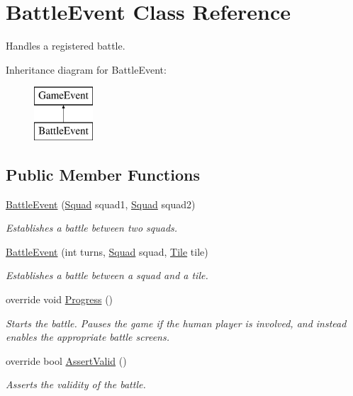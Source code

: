 \hypertarget{class_battle_event}{}\section{Battle\+Event Class Reference}
\label{class_battle_event}


Handles a registered battle.  


Inheritance diagram for Battle\+Event\+:\begin{figure}[H]
\begin{center}
\leavevmode
\includegraphics[height=2.000000cm]{class_battle_event}
\end{center}
\end{figure}
\subsection*{Public Member Functions}
\begin{DoxyCompactItemize}
\item 
\hyperlink{class_battle_event_a50da85dfd481392da0abb531bd22795c}{Battle\+Event} (\hyperlink{class_squad}{Squad} squad1, \hyperlink{class_squad}{Squad} squad2)
\begin{DoxyCompactList}\small\item\em Establishes a battle between two squads. \end{DoxyCompactList}\item 
\hyperlink{class_battle_event_a7ab8f52991156616cf087c759873e60d}{Battle\+Event} (int turns, \hyperlink{class_squad}{Squad} squad, \hyperlink{class_tile}{Tile} tile)
\begin{DoxyCompactList}\small\item\em Establishes a battle between a squad and a tile. \end{DoxyCompactList}\item 
override void \hyperlink{class_battle_event_a5555b2adc60389a54aff08e76314f9df}{Progress} ()
\begin{DoxyCompactList}\small\item\em Starts the battle. Pauses the game if the human player is involved, and instead enables the appropriate battle screens. \end{DoxyCompactList}\item 
override bool \hyperlink{class_battle_event_a95ddc833b90864085cf633fc3490ba23}{Assert\+Valid} ()
\begin{DoxyCompactList}\small\item\em Asserts the validity of the battle. \end{DoxyCompactList}\end{DoxyCompactItemize}
